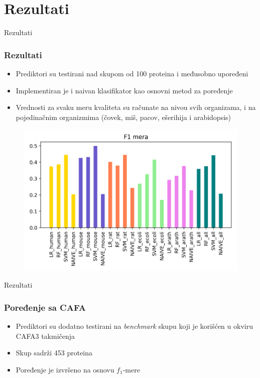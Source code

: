 \documentclass{beamer}
\begin{document}
\section{Rezultati}
\begin{frame}{Rezultati}
	\frametitle{Rezultati}
	\begin{itemize}
		\item Prediktori su testirani nad skupom od 100 proteina i međusobno upoređeni
		
		\item Implementiran je i naivan klasifikator kao osnovni metod za poređenje 
		
		\item Vrednosti za svaku meru kvaliteta su računate na nivou svih organizama, i na pojedinačnim organizmima (čovek, miš, pacov, ešerihija i arabidopsis)
		
	\end{itemize}
	
\end{frame}


\begin{frame}
	\begin{figure}
		\includegraphics[width=\textwidth]{../Tekst/Figures/f1_poredjenje.png}
	\end{figure}
	
\end{frame}

\begin{frame}{Rezultati}
	\frametitle{Poređenje sa CAFA}
	\begin{itemize}
		\item Prediktori su dodatno testirani na \textit{benchmark} skupu koji je korišćen u okviru CAFA3 takmičenja
		
		\item Skup sadrži 453 proteina 
		
		\item Poređenje je izvršeno na osnovu $f_1$-mere
		
	\end{itemize}
	
\end{frame}
\end{document}
